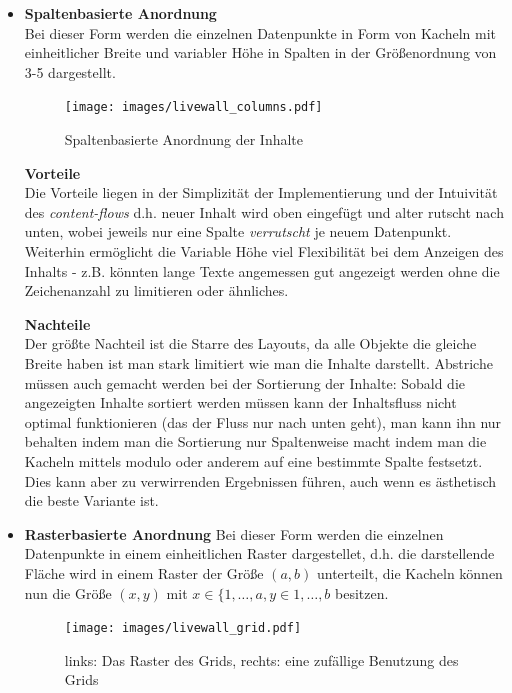\documentclass[12pt,twoside]{book}
\begin{document}
\begin{itemize}
  \item \textbf{Spaltenbasierte Anordnung} \\
  Bei dieser Form werden die einzelnen Datenpunkte in Form von Kacheln mit einheitlicher Breite und variabler Höhe in Spalten in der Größenordnung von 3-5 dargestellt.

  \begin{figure}[H]
    \centering
    \texttt{[image: images/livewall\_columns.pdf]}
    \caption{Spaltenbasierte Anordnung der Inhalte}
    \label{fig:awesome_image}
  \end{figure}

  \textbf{Vorteile} \\
  Die Vorteile liegen in der Simplizität der Implementierung und der Intuivität des \textit{content-flows} d.h. neuer Inhalt wird oben eingefügt und alter rutscht nach unten, wobei jeweils nur eine Spalte \textit{verrutscht} je neuem Datenpunkt.
  Weiterhin ermöglicht die Variable Höhe viel Flexibilität bei dem Anzeigen des Inhalts - z.B. könnten lange Texte angemessen gut angezeigt werden ohne die Zeichenanzahl zu limitieren oder ähnliches.

  \textbf{Nachteile}\\
  Der größte Nachteil ist die Starre des Layouts, da alle Objekte die gleiche Breite haben ist man stark limitiert wie man die Inhalte darstellt. Abstriche m\"ussen auch gemacht werden bei der Sortierung der Inhalte: Sobald die angezeigten Inhalte sortiert werden m\"ussen kann der Inhaltsfluss nicht optimal funktionieren (das der Fluss nur nach unten geht), man kann ihn nur behalten indem man die Sortierung nur Spaltenweise macht indem man die Kacheln mittels modulo oder anderem auf eine bestimmte Spalte festsetzt. Dies kann aber zu verwirrenden Ergebnissen führen, auch wenn es ästhetisch die beste Variante ist.

  \item \textbf{Rasterbasierte Anordnung}
  Bei dieser Form werden die einzelnen Datenpunkte in einem einheitlichen Raster dargestellet, d.h. die darstellende Fläche wird in einem Raster der Größe $(a, b)$ unterteilt, die Kacheln können nun die Größe $(x, y)$ mit $ x \in \{1, \dots, a, y \in 1, \dots, b$ besitzen.

  \begin{figure}[H]
    \centering
    \texttt{[image: images/livewall\_grid.pdf]}
    \caption{links: Das Raster des Grids, rechts: eine zufällige Benutzung des Grids}
    \label{fig:awesome_image}
  \end{figure}


\end{itemize}
\end{document}

